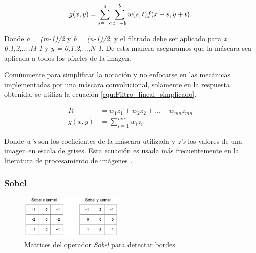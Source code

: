 \begin{onehalfspacing}
\begin{equation}
	\label{equ:Filtro_lineal}
	g(x,y) =  \sum_{s=-a}^{a}\sum_{t=-b}^{b}w(s,t)f(x+s,y+t).\\
\end{equation}

Donde \textit{a = (m-1)/2} y \textit{b = (n-1)/2}, y el filtrado debe ser aplicado para \textit{x = 0,1,2,...,M-1} y \textit{y = 0,1,2,...,N-1}. De esta manera aseguramos que la máscara sea aplicada a todos los píxeles de la imagen. 

Comúnmente para simplificar la notación y no enfocarse en las mecánicas implementadas por una máscara convolucional, solamente en la respuesta obtenida, se utiliza la ecuación \ref{equ:Filtro_lineal_simplicado}.

\begin{equation} 
\label{equ:Filtro_lineal_simplicado}
\begin{split}
R &= w_{1}z_{1} + w_{2}z_{2} + ... + w_{mn}z_{mn} \\
g(x,y) &=  \sum_{i=1}^{mn}w_{i}z_{i}.
\end{split}
\end{equation}

Donde \textit{w's} son los coeficientes de la máscara utilizada y \textit{z's} los valores de una imagen en escala de grises. Esta ecuación es usada más frecuentemente en la literatura de procesamiento de imágenes \cite{GonzalezDigitalProcessing.pdf}.

\subsubsection{Sobel}
\label{Sobel}

\begin{figure}[th]
	\centering
	\includegraphics[width=5cm,keepaspectratio]{XX_Figures/Fig_Matrices_Sobel.png}
	\caption{\footnotesize Matrices del operador \textit{Sobel} para detectar bordes.}
	\label{fig:Fig_Matrices_Sobel}
\end{figure}


\end{onehalfspacing}
